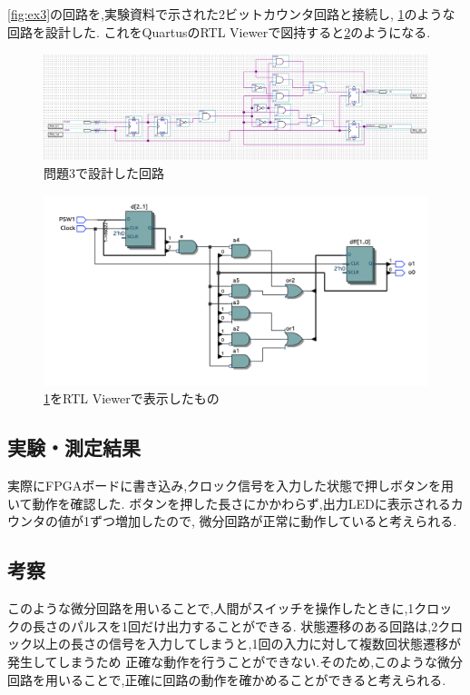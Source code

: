 \documentclass[autodetect-engine, dvi=dvipdfmx, 10pt, a4paper, ja=standard]{bxjsarticle}
\begin{document}
\ref{fig:ex3}の回路を,実験資料で示された2ビットカウンタ回路と接続し,
\ref{fig:ex3-cropped}のような回路を設計した.
これをQuartusのRTL Viewerで図持すると\ref{fig:ex3-rtl}のようになる.

\begin{figure}[H]
	\centering
	\includegraphics[width=\columnwidth]{asset/ex3.png}
	\caption{問題3で設計した回路}
	\label{fig:ex3-cropped}
\end{figure}

\begin{figure}[H]
	\centering
	\includegraphics[width=\columnwidth]{asset/ex3_pretty.png}
	\caption{\ref{fig:ex3-cropped}をRTL Viewerで表示したもの}
	\label{fig:ex3-rtl}
\end{figure}

\subsection{実験・測定結果}

実際にFPGAボードに書き込み,クロック信号を入力した状態で押しボタンを用いて動作を確認した.
ボタンを押した長さにかかわらず,出力LEDに表示されるカウンタの値が1ずつ増加したので,
微分回路が正常に動作していると考えられる.

\subsection{考察}
このような微分回路を用いることで,人間がスイッチを操作したときに,1クロックの長さのパルスを1回だけ出力することができる.
状態遷移のある回路は,2クロック以上の長さの信号を入力してしまうと,1回の入力に対して複数回状態遷移が発生してしまうため
正確な動作を行うことができない.そのため,このような微分回路を用いることで,正確に回路の動作を確かめることができると考えられる.
\end{document}
